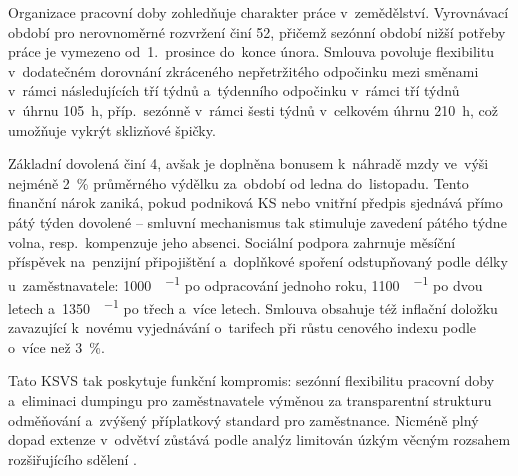 Organizace pracovní doby zohledňuje charakter práce v~zemědělství. Vyrovnávací období pro nerovnoměrné rozvržení činí \SI{52}{\week}, přičemž sezónní období nižší potřeby práce je vymezeno od~1.~prosince do~konce února. Smlouva povoluje flexibilitu v~dodatečném dorovnání zkráceného nepřetržitého odpočinku mezi směnami v~rámci následujících tří týdnů a~týdenního odpočinku v~rámci tří týdnů v~úhrnu \SI{105}{\hour}, příp.~sezónně v~rámci šesti týdnů v~celkovém úhrnu \SI{210}{\hour}, což umožňuje vykrýt sklizňové špičky.\par

Základní dovolená činí \SI{4}{\week}, avšak je doplněna bonusem k~náhradě mzdy ve~výši nejméně \SI{2}{\percent} průměrného výdělku za~období od ledna do~listopadu. Tento finanční nárok zaniká, pokud podniková \ac{KS} nebo vnitřní předpis sjednává přímo pátý týden dovolené -- smluvní mechanismus tak stimuluje zavedení pátého týdne volna, resp.~kompenzuje jeho absenci. Sociální podpora zahrnuje měsíční příspěvek na~penzijní připojištění a~doplňkové spoření odstupňovaný podle délky  u~zaměstnavatele: \SI{1000}{\czk\per\month} po odpracování jednoho roku, \SI{1100}{\czk\per\month} po dvou letech a~\SI{1350}{\czk\per\month} po třech a~více letech. Smlouva obsahuje též inflační doložku zavazující k~novému vyjednávání o~tarifech při růstu cenového indexu podle  o~více než \SI{3}{\percent}.\par

Tato \ac{KSVS} tak poskytuje funkční kompromis: sezónní flexibilitu pracovní doby a~eliminaci dumpingu pro zaměstnavatele výměnou za transparentní strukturu odměňování a~zvýšený příplatkový standard pro zaměstnance. Nicméně plný dopad extenze v~odvětví zůstává podle analýz  limitován úzkým věcným rozsahem rozšiřujícího sdělení .~\cite{KSVS_OSPZV_ASO_2026}~\cite{CMKOS_ZpravaKV2025}\par
